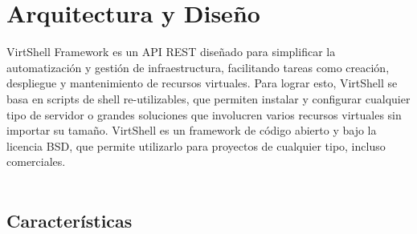 \chapter{Arquitectura y Diseño}
\label{Arquitectura}

VirtShell Framework es un API REST diseñado para simplificar la automatización y gestión de infraestructura, facilitando tareas como creación, despliegue y mantenimiento de recursos virtuales. Para lograr esto, VirtShell se basa en scripts de shell re-utilizables, que permiten instalar y configurar cualquier tipo de servidor o grandes soluciones que involucren varios recursos virtuales sin importar su tamaño. VirtShell es un framework de código abierto y bajo la licencia BSD, que permite utilizarlo para proyectos de cualquier tipo, incluso comerciales. \\
\\
\section{Características}

